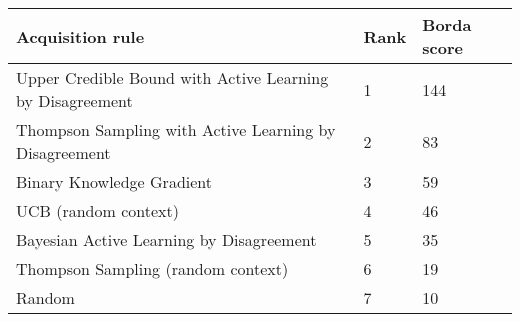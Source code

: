 \begin{tabular}{lll}
Acquisition rule & Rank & Borda score \\ 
\hline 
Upper Credible Bound with Active Learning by Disagreement & 1 & 144 \\ 
Thompson Sampling with Active Learning by Disagreement    & 2 & 83 \\ 
Binary Knowledge Gradient                                 & 3 & 59 \\ 
UCB (random context)                                      & 4 & 46 \\ 
Bayesian Active Learning by Disagreement                  & 5 & 35 \\ 
Thompson Sampling (random context)                        & 6 & 19 \\ 
Random                                                    & 7 & 10 \\ 
\hline 
\end{tabular}